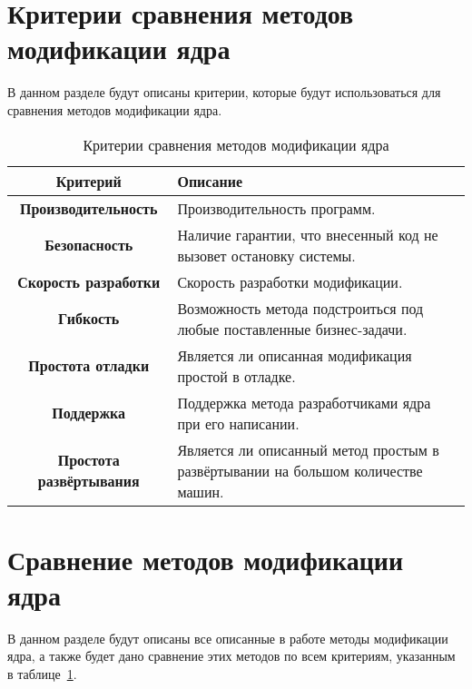 \section{Критерии сравнения методов модификации ядра}\label{sec:----}
В данном разделе будут описаны критерии, которые будут использоваться для сравнения методов модификации ядра.

\begin{table}[H]
\begin{center}
    \begin{threeparttable}
      \captionsetup{justification=raggedright,singlelinecheck=off}
      \caption{\label{tab:criteria}Критерии сравнения методов модификации ядра}
        \begin{tabular}{|c|p{8cm}|}
        \hline
        \textbf{Критерий} & \textbf{Описание} \\ \hline
        \textbf{Производительность} & Производительность программ. \\ \hline
        \textbf{Безопасность} & Наличие гарантии, что внесенный код не вызовет остановку системы. \\ \hline
        \textbf{Скорость разработки} & Скорость разработки модификации. \\ \hline
        \textbf{Гибкость} & Возможность метода подстроиться под любые поставленные бизнес-задачи. \\ \hline
        \textbf{Простота отладки} & Является ли описанная модификация простой в отладке. \\ \hline
        \textbf{Поддержка} & Поддержка метода разработчиками ядра при его написании. \\ \hline
        \textbf{Простота развёртывания} & Является ли описанный метод простым в развёртывании на большом количестве машин. \\ \hline
        \end{tabular}
    \end{threeparttable}
\end{center}
\end{table}
\newpage
\section{Сравнение методов модификации ядра}\label{sec:---}
В данном разделе будут описаны все описанные в работе методы модификации ядра, а также будет дано сравнение этих методов по всем критериям, указанным в таблице~\ref{tab:criteria}.

